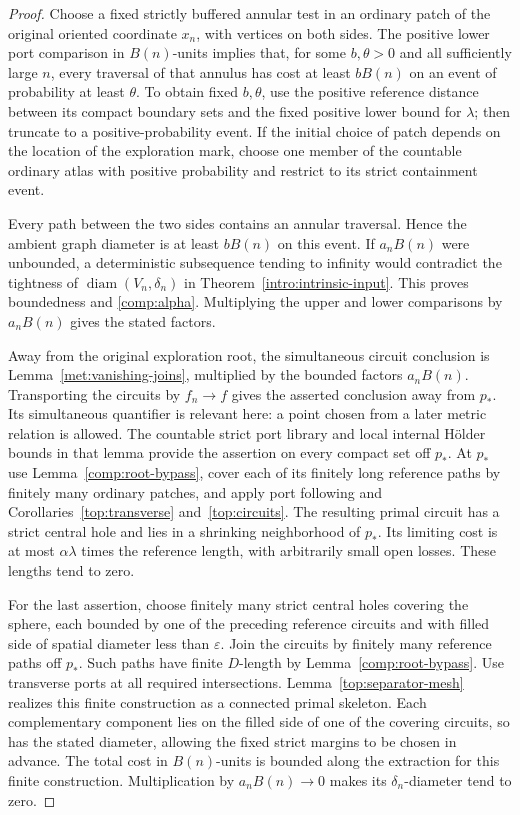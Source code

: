 \documentclass[11pt]{article}
\numberwithin{equation}{section}
\theoremstyle{definition}
\theoremstyle{remark}
\newcommand{\1}{\mathbf 1}
\DeclareMathOperator{\diam}{diam}
\begin{document}
\begin{proof}
Choose a fixed strictly buffered annular test in an ordinary patch
of the original oriented coordinate $x_n$, with vertices on both
sides.  The positive lower port comparison in
$B(n)$-units implies that, for some $b,\theta>0$ and all sufficiently
large $n$, every traversal of that annulus has cost at least $bB(n)$
on an event of probability at least $\theta$.  To obtain fixed
$b,\theta$, use the positive reference distance between its compact
boundary sets and the fixed positive lower bound for $\lambda$;
then truncate to a positive-probability event.  If the initial
choice of patch depends on the location of the exploration mark,
choose one member of the countable ordinary atlas with positive
probability and restrict to its strict containment event.

Every path between the two sides contains an annular traversal.
Hence the ambient graph diameter is at least $bB(n)$ on this event.
If $a_nB(n)$ were unbounded, a deterministic subsequence tending to
infinity would contradict the tightness of
$\diam(V_n,\delta_n)$ in Theorem~\ref{intro:intrinsic-input}.
This proves boundedness and \eqref{comp:alpha}.  Multiplying the
upper and lower comparisons by $a_nB(n)$ gives the stated factors.

Away from the original exploration root, the simultaneous circuit
conclusion is Lemma~\ref{met:vanishing-joins}, multiplied by the
bounded factors $a_nB(n)$.  Transporting the circuits by $f_n\to f$
gives the asserted conclusion away from $p_*$.  Its simultaneous
quantifier is relevant here: a point
chosen from a later metric relation is allowed.  The countable
strict port library and local internal H\"older bounds in that
lemma provide the assertion on every compact set off $p_*$.  At
$p_*$ use Lemma~\ref{comp:root-bypass}, cover each of its finitely
long reference paths by finitely many ordinary patches, and apply
port following and Corollaries~\ref{top:transverse} and~\ref{top:circuits}.
The resulting primal circuit has a strict central hole and lies in
a shrinking neighborhood of $p_*$.  Its limiting cost is at most
$\alpha\lambda$ times the reference length, with arbitrarily small
open losses.  These lengths tend to zero.

For the last assertion, choose finitely many strict central holes
covering the sphere, each bounded by one of the preceding reference
circuits and with filled side of spatial diameter less than
$\varepsilon$.  Join the circuits by finitely many reference paths
off $p_*$.  Such paths have finite $D$-length by
Lemma~\ref{comp:root-bypass}.  Use transverse ports at all required
intersections.  Lemma~\ref{top:separator-mesh} realizes this finite
construction as a connected primal skeleton.  Each complementary
component lies on the filled side of one of the covering circuits,
so has the stated diameter, allowing the fixed strict margins to
be chosen in advance.  The total cost in $B(n)$-units is bounded
along the extraction for this finite construction.  Multiplication
by $a_nB(n)\to0$ makes its $\delta_n$-diameter tend to zero.
\end{proof}
\end{document}
